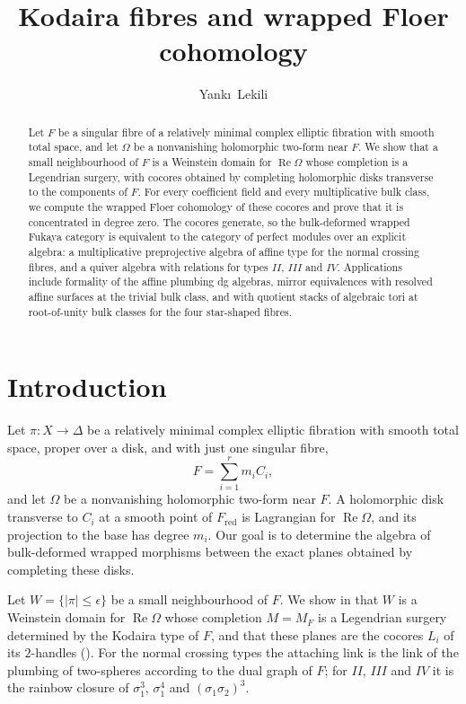 \documentclass[a4paper]{amsart}
\title{Kodaira fibres and wrapped Floer cohomology}
\author{Yank\i\ Lekili}
\date{}
\DeclareMathOperator{\Ree}{Re}
\numberwithin{equation}{section}
\begin{document}
\begin{abstract}
Let $F$ be a singular fibre of a relatively minimal complex elliptic
fibration with smooth total space, and let $\Omega$ be a nonvanishing
holomorphic two-form near $F$. We show that a small neighbourhood of $F$
is a Weinstein domain for $\Ree\Omega$ whose completion is a Legendrian
surgery, with cocores obtained by completing holomorphic disks
transverse to the components of $F$. For every coefficient field and
every multiplicative bulk class, we compute the wrapped Floer cohomology
of these cocores and prove that it is concentrated in degree zero. The
cocores generate, so the bulk-deformed wrapped Fukaya category is
equivalent to the category of perfect modules over an explicit algebra:
a multiplicative preprojective algebra of affine type for the normal
crossing fibres, and a quiver algebra with relations for types $II$,
$III$ and $IV$. Applications include formality of the affine plumbing
dg algebras, mirror equivalences with resolved affine surfaces at the
trivial bulk class, and with quotient stacks of
algebraic tori at root-of-unity bulk classes for the four star-shaped
fibres.
\end{abstract}
\maketitle

\section{Introduction}
\label{sec:introduction}

Let $\pi:X\to\Delta$ be a relatively minimal complex elliptic
fibration with smooth total space, proper over a disk, and with just
one singular fibre, \[ F=\sum_{i=1}^{r} m_iC_i,\] and let $\Omega$ be a
nonvanishing holomorphic two-form near $F$.
A holomorphic disk transverse to $C_i$ at a smooth point of
$F_{\mathrm{red}}$ is Lagrangian for $\Ree\Omega$, and its projection
to the base has degree $m_i$. Our goal is to determine the algebra of bulk-deformed wrapped
morphisms between the exact planes obtained by completing these disks.

Let $W=\{|\pi|\le\epsilon\}$ be a small neighbourhood of $F$. We show
in  that $W$ is a Weinstein domain for
$\Ree\Omega$ whose completion $M=M_F$ is a Legendrian surgery determined by
the Kodaira type of $F$, and that these planes are the cocores $L_i$ of
its $2$-handles (). For
the normal crossing types the attaching link is the link of the plumbing
of two-spheres according to the dual graph of $F$; for $II$, $III$ and
$IV$ it is the rainbow closure of $\sigma_1^3$, $\sigma_1^4$ and
$(\sigma_1\sigma_2)^3$.
\end{document}
